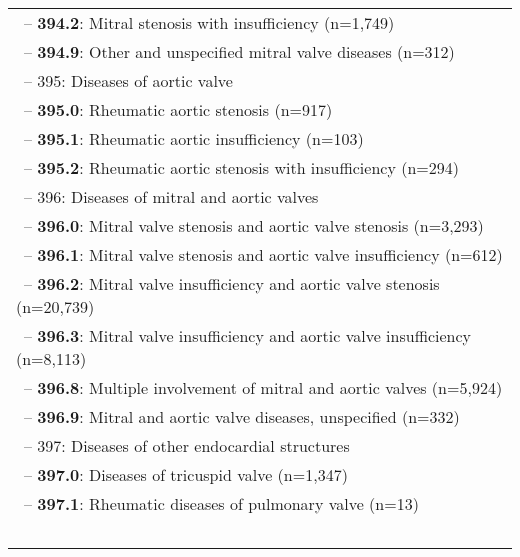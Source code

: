 \begin{longtable}{p{\textwidth}}
\-\ \hspace{30pt}\footnotesize{-- {\color{ForestGreen} \textbf{394.2}}: Mitral stenosis with insufficiency (n=1,749)} \\ \-\ \hspace{30pt}\footnotesize{-- {\color{ForestGreen} \textbf{394.9}}: Other and unspecified mitral valve diseases (n=312)} \\ \-\ \hspace{20pt}\footnotesize{-- 395: Diseases of aortic valve} \\ \-\ \hspace{30pt}\footnotesize{-- {\color{ForestGreen} \textbf{395.0}}: Rheumatic aortic stenosis (n=917)} \\ \-\ \hspace{30pt}\footnotesize{-- {\color{ForestGreen} \textbf{395.1}}: Rheumatic aortic insufficiency (n=103)} \\ \-\ \hspace{30pt}\footnotesize{-- {\color{ForestGreen} \textbf{395.2}}: Rheumatic aortic stenosis with insufficiency (n=294)} \\ \-\ \hspace{20pt}\footnotesize{-- 396: Diseases of mitral and aortic valves} \\ \-\ \hspace{30pt}\footnotesize{-- {\color{ForestGreen} \textbf{396.0}}: Mitral valve stenosis and aortic valve stenosis (n=3,293)} \\ \-\ \hspace{30pt}\footnotesize{-- {\color{ForestGreen} \textbf{396.1}}: Mitral valve stenosis and aortic valve insufficiency (n=612)} \\ \-\ \hspace{30pt}\footnotesize{-- {\color{ForestGreen} \textbf{396.2}}: Mitral valve insufficiency and aortic valve stenosis (n=20,739)} \\ \-\ \hspace{30pt}\footnotesize{-- {\color{ForestGreen} \textbf{396.3}}: Mitral valve insufficiency and aortic valve insufficiency (n=8,113)} \\ \-\ \hspace{30pt}\footnotesize{-- {\color{ForestGreen} \textbf{396.8}}: Multiple involvement of mitral and aortic valves (n=5,924)} \\ \-\ \hspace{30pt}\footnotesize{-- {\color{ForestGreen} \textbf{396.9}}: Mitral and aortic valve diseases, unspecified (n=332)} \\ \-\ \hspace{20pt}\footnotesize{-- 397: Diseases of other endocardial structures} \\ \-\ \hspace{30pt}\footnotesize{-- {\color{ForestGreen} \textbf{397.0}}: Diseases of tricuspid valve (n=1,347)} \\ \-\ \hspace{30pt}\footnotesize{-- {\color{ForestGreen} \textbf{397.1}}: Rheumatic diseases of pulmonary valve (n=13)} \\ \-\ \hspace{30pt}\footnotesize{-- {\color{ForestGreen} \textbf{397.9}}: Rheumatic 
\end{longtable}
